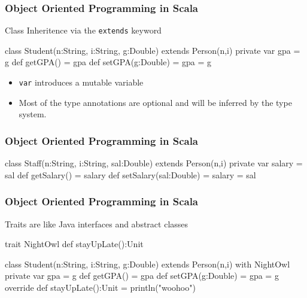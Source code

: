 \documentclass{beamer}
\newcommand{\beb}{\begin{exampleblock}}
\newcommand{\eeb}{\end{exampleblock}}
\begin{document}
\begin{frame}[fragile]
\frametitle{Object Oriented Programming in Scala}

\beb{Class Inheritence via the {\tt extends} keyword}
\begin{code}
class Student(n:String, i:String, g:Double) 
                     extends Person(n,i) {
   private var gpa = g
   def getGPA() = gpa
   def setGPA(g:Double) = {
      gpa = g
   }
}
\end{code}
\eeb
\begin{itemize}
 \item {\tt var} introduces a mutable variable
 \item Most of the type annotations are optional and will be inferred
   by the type system.
\end{itemize}
\end{frame}


\begin{frame}[fragile]
\frametitle{Object Oriented Programming in Scala}
\beb{}
\begin{code}
class Staff(n:String, i:String, sal:Double) 
                 extends Person(n,i) {
   private var salary = sal
   def getSalary() = salary
   def setSalary(sal:Double) = 
   {
      salary = sal
   }
}
\end{code}
\eeb
\end{frame}



\begin{frame}[fragile]
\frametitle{Object Oriented Programming in Scala}
\beb{Traits are like Java interfaces and abstract classes}
\begin{code}
trait NightOwl {
   def stayUpLate():Unit 
}

class Student(n:String, i:String, g:Double) 
      extends Person(n,i) with NightOwl {
   private var gpa = g
   def getGPA() = gpa
   def setGPA(g:Double) = {
      gpa = g
   }
   override def stayUpLate():Unit = { 
      println("woohoo") 
   }
}
\end{code}
\eeb
\end{frame}
\end{document}
